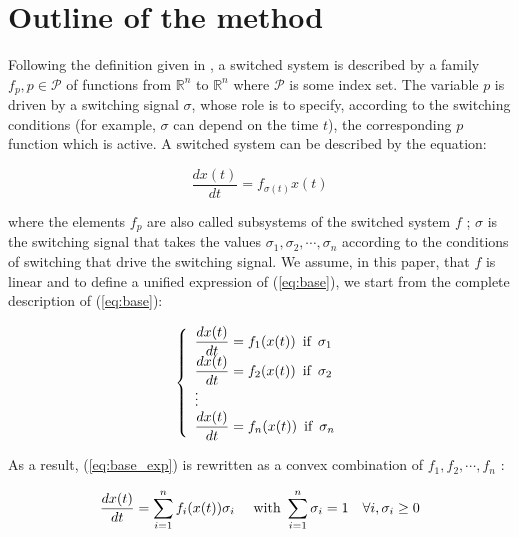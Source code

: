\documentclass[12pt]{article}
\begin{document}
\section{Outline of the method}


Following the definition given in \cite{Liber}, a switched system is described by a family $f_p, p \in \mathcal{P}$ of functions from $\mathbb{R}^n$ to $\mathbb{R}^n$ where 
$\mathcal{P}$ is some index set. The variable $p$ is driven by a switching signal $\sigma$, whose role is to specify, according to the switching conditions (for example, $\sigma$ can 
depend on the time $t$), the corresponding $p$ function which is active. A switched system can be described by the equation:

\begin{equation}\label{eq:base}
\frac{d x(t)}{d t} = f_{\sigma(t)} x(t)
\end{equation}

\noindent
where the elements $f_p$ are also called subsystems of the switched system $f$ ; $\sigma$ is the switching signal that takes the values $\sigma_1, \sigma_2, \cdots, \sigma_n$ according to 
the conditions of switching that drive the switching signal.
We assume, in this paper, that $f$ is linear and to define a unified expression of (\ref{eq:base}), we start from the complete description of (\ref{eq:base}):

\begin{equation}\label{eq:base_exp}
\left\{ \begin{array}{l}
 \displaystyle{  \frac{d x(t)}{d t} = f_1 (x(t)) }  \, \hbox{ if } \, \sigma_1 \\      
 \displaystyle{  \frac{d x(t)}{d t} = f_2 (x(t)) }  \, \hbox{ if } \, \sigma_2 \\ 
 \vdots \\
 \displaystyle{  \frac{d x(t)}{d t} = f_n (x(t)) }  \, \hbox{ if } \, \sigma_n \\
        \end{array} \right.
\end{equation}

\noindent
As a result, (\ref{eq:base_exp}) is rewritten as a convex combination of $f_1, f_2, \cdots, f_n$ :

\begin{equation}\label{eq:base_convex}
  \frac{d x(t)}{d t} = \sum_{i = 1}^n  f_i(x(t)) \sigma_i \quad \hbox{ with }  \sum_{i = 1}^n \sigma_i = 1  \quad \forall i, \sigma_i \geq 0
\end{equation}
\end{document}
